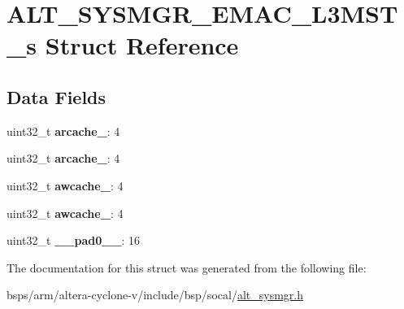 \hypertarget{structALT__SYSMGR__EMAC__L3MST__s}{}\section{A\+L\+T\+\_\+\+S\+Y\+S\+M\+G\+R\+\_\+\+E\+M\+A\+C\+\_\+\+L3\+M\+S\+T\+\_\+s Struct Reference}
\label{structALT__SYSMGR__EMAC__L3MST__s}
\subsection*{Data Fields}
\begin{DoxyCompactItemize}
\item 
\mbox{\label{structALT__SYSMGR__EMAC__L3MST__s_ae2a75046acb8e106d6eac19e8219c517}} 
uint32\+\_\+t {\bfseries arcache\+\_}\+: 4
\item 
\mbox{\label{structALT__SYSMGR__EMAC__L3MST__s_a4b5e4bd0823e200ff4619ab89a748a5c}} 
uint32\+\_\+t {\bfseries arcache\+\_}\+: 4
\item 
\mbox{\label{structALT__SYSMGR__EMAC__L3MST__s_a38413fd4f3037c599f3d5d0ec199a2be}} 
uint32\+\_\+t {\bfseries awcache\+\_}\+: 4
\item 
\mbox{\label{structALT__SYSMGR__EMAC__L3MST__s_a53878a1d3b0490206c6a80659b7b257d}} 
uint32\+\_\+t {\bfseries awcache\+\_}\+: 4
\item 
\mbox{\label{structALT__SYSMGR__EMAC__L3MST__s_afb494f412751dd81360329d83591a3b6}} 
uint32\+\_\+t {\bfseries \+\_\+\+\_\+pad0\+\_\+\+\_\+}\+: 16
\end{DoxyCompactItemize}


The documentation for this struct was generated from the following file\+:\begin{DoxyCompactItemize}
\item 
bsps/arm/altera-\/cyclone-\/v/include/bsp/socal/\mbox{\hyperlink{alt__sysmgr_8h}{alt\+\_\+sysmgr.\+h}}\end{DoxyCompactItemize}

